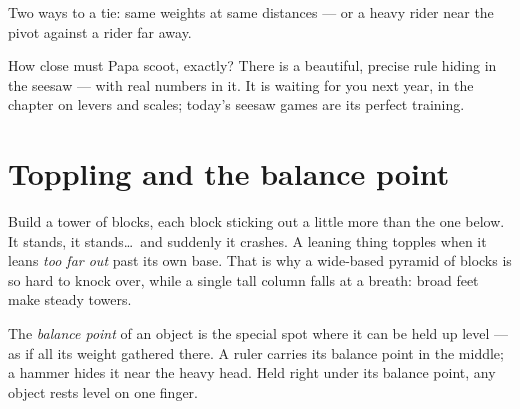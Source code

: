 \begin{omfigure}

{\small Two ways to a tie: same weights at same distances --- or a
heavy rider near the pivot against a  rider far away.}
\end{omfigure}

\begin{remark}[A promise]\label{rem:g2:balance-equilibrium:promise}
How close must Papa scoot, exactly? There is a beautiful, precise
rule hiding in the seesaw --- with real numbers in it. It is waiting
for you next year, in the chapter on levers and scales; today's
seesaw games are its perfect training.
\end{remark}

\section{Toppling and the balance point}

\begin{example}\label{ex:g2:balance-equilibrium:tower}
Build a tower of blocks, each block sticking out a little more than
the one below. It stands, it stands\dots\ and suddenly it crashes. A
leaning thing topples when it leans \emph{too far out} past its own
base. That is why a wide-based pyramid of blocks is so hard to knock
over, while a single tall column falls at a breath: broad feet make
steady towers.
\end{example}

\begin{definition}\label{def:g2:balance-equilibrium:point}
The \emph{balance point} of an object is the
special spot where it can be held up level --- as if all its weight
gathered there. A ruler carries its balance point in the middle; a
hammer hides it near the heavy head. Held right under its balance
point, any object rests level on one finger.
\end{definition}

